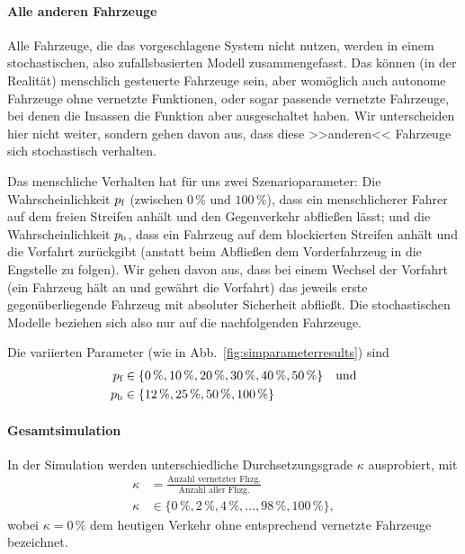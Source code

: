 \paragraph{Alle anderen Fahrzeuge} Alle Fahrzeuge, die das vorgeschlagene System nicht nutzen, werden in einem stochastischen, also zufallsbasierten Modell zusammengefasst. Das können (in der Realität) menschlich gesteuerte Fahrzeuge sein, aber womöglich auch autonome Fahrzeuge ohne vernetzte Funktionen, oder sogar passende vernetzte Fahrzeuge, bei denen die Insassen die Funktion aber ausgeschaltet haben. Wir unterscheiden hier nicht weiter, sondern gehen davon aus, dass diese >>anderen<< Fahrzeuge sich stochastisch verhalten.

Das menschliche Verhalten hat für uns zwei Szenarioparameter: Die Wahrscheinlichkeit $p_{\text{f}}$ (zwischen $0\,\%$ und $100\,\%$), dass ein menschlicherer Fahrer auf dem freien Streifen anhält und den Gegenverkehr abfließen lässt; und die Wahrscheinlichkeit $p_{\text{b}}$, dass ein Fahrzeug auf dem blockierten Streifen anhält und die Vorfahrt zurückgibt (anstatt beim Abfließen dem Vorderfahrzeug in die Engstelle zu folgen). Wir gehen davon aus, dass bei einem Wechsel der Vorfahrt (ein Fahrzeug hält an und gewährt die Vorfahrt) das jeweils erste gegenüberliegende Fahrzeug mit absoluter Sicherheit abfließt. Die stochastischen Modelle beziehen sich also nur auf die nachfolgenden Fahrzeuge.

Die variierten Parameter (wie in Abb.~\ref{fig:simparameterresults}) sind
\begin{equation}
\begin{aligned}
p_{\text{f}} &\in \{0\,\%, 10\,\%, 20\,\%, 30\,\%, 40\,\%, 50\,\%\}\quad\text{und}\\
p_{\text{b}} &\in \{12\,\%, 25\,\%, 50\,\%, 100\,\%\}
\end{aligned}
\end{equation}

\paragraph{Gesamtsimulation} In der Simulation werden unterschiedliche Durchsetzungsgrade $\kappa$ ausprobiert, mit
\begin{align}
\kappa &= \frac{\text{Anzahl vernetzter Fhzg.}}{\text{Anzahl aller Fhzg.}}\\[4pt]
\kappa &\in \{0\,\%, 2\,\%, 4\,\%, ..., 98\,\%, 100\,\%\},
\end{align}
wobei $\kappa = 0\,\%$ dem heutigen Verkehr ohne entsprechend vernetzte Fahrzeuge bezeichnet.

